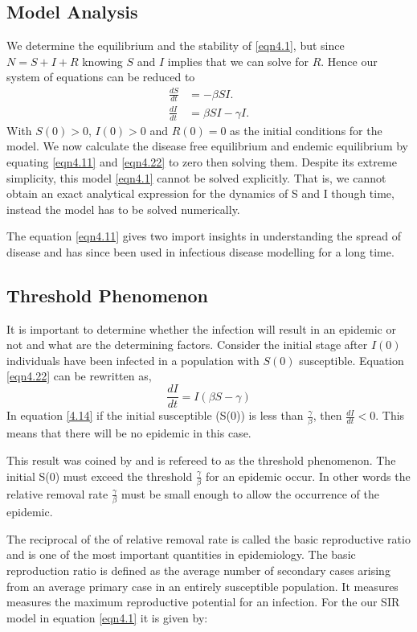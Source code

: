 \subsection{Model Analysis}
We determine the equilibrium and the stability of \ref{eqn4.1}, but since $N =S + I + R$ knowing $S$ and $I$ implies that we can solve for  $R$. Hence our system of equations can be reduced to 
\begin{align}
\frac{dS}{dt} &=-\beta SI. \label{eqn4.11} \\
 \frac{dI}{dt} &= \beta S I - \gamma  I \label{eqn4.22}.
\end{align}
 With $S(0) >0$, $I(0) > 0$ and $R(0) =0$ as the initial conditions for the model.
 We now calculate the disease free equilibrium and endemic equilibrium by equating \ref{eqn4.11} and \ref{eqn4.22} to zero then solving them. Despite its extreme simplicity, this model \ref{eqn4.1} cannot be solved explicitly. That is, we cannot obtain an exact analytical expression for the dynamics of S and I
though time, instead the model has to be solved numerically.

The equation \ref{eqn4.11} gives two import insights in understanding the spread of disease and has since been used in infectious disease modelling for a long time.

\subsection{Threshold Phenomenon} 
It is important to determine whether the infection will result in an epidemic or not and what are the determining factors. Consider the initial stage after $I (0) $ individuals have been infected in a population with $S (0) $ susceptible. Equation \ref{eqn4.22} can be rewritten as,
\begin{equation} 
\frac{dI}{dt} = I \left(\beta S -\gamma \right)\label{4.14}
\end{equation}
In equation \ref{4.14} if the initial susceptible (S(0)) is less than $\frac{\gamma}{\beta}$, then $\frac{dI}{dt} < 0 $. This means that there will be no epidemic in this case.

This result was coined by \cite{m1925applications} and  is refereed to as the threshold phenomenon. The initial S(0) must exceed the threshold $\frac{\gamma}{\beta}$ for an epidemic occur. In  other words the relative removal rate $\frac{\gamma}{\beta}$ must be small enough to allow the occurrence  of the epidemic.
 
 The reciprocal of the of relative removal rate is called the basic reproductive ratio and is one of the most important quantities in epidemiology. The basic reproduction ratio is defined as the average number of secondary cases arising from an average primary case in an entirely susceptible population. It measures measures the maximum reproductive potential for an infection. For the our SIR model in equation \ref{eqn4.1} it is given by:

